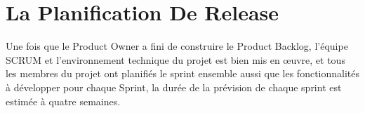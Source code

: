 \section{La Planification De Release}
\noindent
Une fois que le Product Owner a fini de construire le Product Backlog, l'équipe SCRUM et l'environnement technique du projet est bien mis en œuvre, et tous les membres du projet ont planifiés le sprint ensemble aussi que les fonctionnalités à développer pour chaque Sprint, la durée de la prévision de chaque sprint est estimée à quatre semaines.